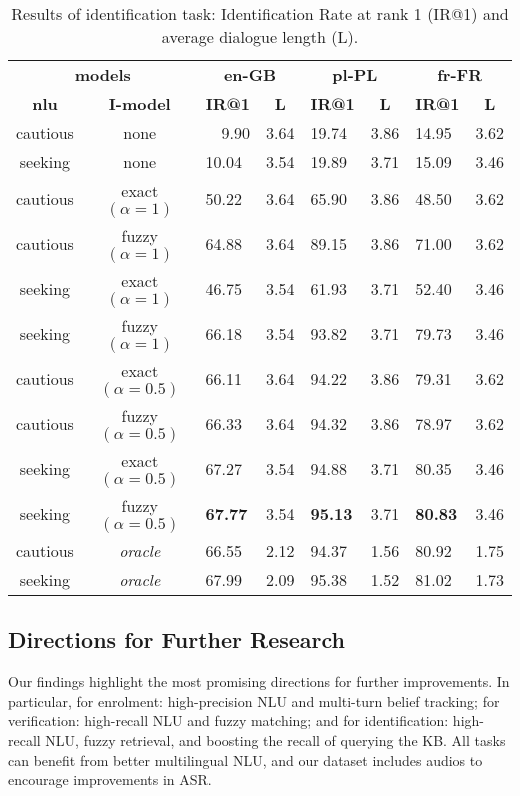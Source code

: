 \documentclass[11pt]{article}
\begin{document}
{\begin{table}[t]
\begin{center}
{\begin{tabular}{cc ll ll ll}
\multicolumn{2}{c}{\textbf{models}} &
\multicolumn{2}{c}{\textbf{en-GB}} &
\multicolumn{2}{c}{\textbf{pl-PL}} &
\multicolumn{2}{c}{\textbf{fr-FR}} \\
\cmidrule(lr){1-2}
\cmidrule(lr){3-4}
\cmidrule(lr){5-6}
\cmidrule(lr){7-8}
\textbf{nlu} & \textbf{I-model} &
\multicolumn{1}{c}{\textbf{IR@1}} & \multicolumn{1}{c}{\textbf{L}} &
\multicolumn{1}{c}{\textbf{IR@1}} & \multicolumn{1}{c}{\textbf{L}} &
\multicolumn{1}{c}{\textbf{IR@1}} & \multicolumn{1}{c}{\textbf{L}} \\
\midrule
cautious & none
& \ \ 9.90 & 3.64
& 19.74 & 3.86 
& 14.95 & 3.62 \\
seeking & none
& 10.04 & 3.54
& 19.89 & 3.71
& 15.09 & 3.46 \\
cautious & exact$(\alpha=1)$
& 50.22 & 3.64
& 65.90 & 3.86
& 48.50 & 3.62 \\
cautious & fuzzy$(\alpha=1)$
& 64.88 & 3.64
& 89.15 & 3.86
& 71.00 & 3.62 \\
seeking & exact$(\alpha=1)$
& 46.75 & 3.54
& 61.93 & 3.71
& 52.40 & 3.46 \\
seeking & fuzzy$(\alpha=1)$
& 66.18 & 3.54 
& 93.82 & 3.71
& 79.73 & 3.46 \\
cautious & exact$(\alpha=0.5)$
& 66.11 & 3.64
& 94.22 & 3.86
& 79.31 & 3.62 \\
cautious & fuzzy$(\alpha=0.5)$
& 66.33 & 3.64
& 94.32 & 3.86
& 78.97 & 3.62 \\
seeking & exact$(\alpha=0.5)$
& 67.27 & 3.54
& 94.88 & 3.71
& 80.35 & 3.46\\
seeking & fuzzy$(\alpha=0.5)$
& \textbf{67.77} & 3.54
& \textbf{95.13} & 3.71
& \textbf{80.83} & 3.46 \\
\midrule
cautious & \textit{oracle}
& 66.55 & 2.12
& 94.37 & 1.56
& 80.92 & 1.75 \\
seeking & \textit{oracle}
& 67.99 & 2.09
& 95.38 & 1.52
& 81.02 & 1.73 \\
\bottomrule
\end{tabular}
}
\end{center}
\caption{Results of identification task: Identification Rate at rank 1 (IR@1)
and average dialogue length (L).
}
\label{tab:results_identification}
\end{table}

 
\subsection{Directions for Further Research}
\vspace{-0.5mm}
Our findings highlight the most promising directions for further improvements.
In particular,
for enrolment: high-precision NLU and multi-turn belief tracking;
for verification: high-recall NLU and fuzzy matching;
and for identification: high-recall NLU, fuzzy retrieval, and boosting the recall of querying the KB.
All tasks can benefit from better multilingual NLU, and our dataset includes audios to encourage improvements in ASR.

}
\end{document}
